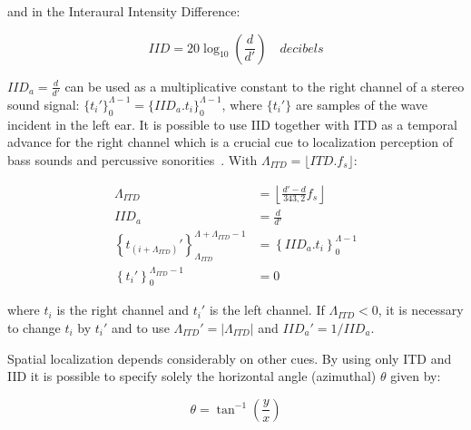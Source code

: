 \noindent and in the Interaural Intensity Difference:

\begin{equation}\label{eq:dii}
IID=20\log_{10}\left (\frac{d}{d'}\right) \quad decibels
\end{equation}

$IID_a=\frac{d}{d'}$ can be used as a multiplicative constant to the right channel of a stereo sound signal: $\{t_i'\}_0^{\Lambda -1}=\{IID_a . t_i\}_0^{\Lambda -1}$, where $\{t_i'\}$ are samples of the wave incident in the left ear. It is possible to use IID together with ITD as a temporal advance for the right channel which is a crucial cue to localization perception of bass sounds and percussive sonorities~\cite{Heeger}. 
With $\Lambda_{ITD}=\lfloor ITD . f_s \rfloor$:

\begin{equation}\label{eq:locImpl}
\begin{split}
\Lambda_{ITD} & = \left \lfloor \frac{d'-d}{343,2}  f_s \right \rfloor \\
IID_a & = \frac{d}{d'} \\
\left\{t_{(i+\Lambda_{ITD})}'\right\}_{\Lambda_{ITD}}^{\Lambda+\Lambda_{ITD}-1} & =\left\{IID_a . t_i\right\}_0^{\Lambda-1} \\
\left\{t_i'\right\}_0^{\Lambda_{ITD}-1} & = 0
\end{split}
\end{equation}

\noindent where $t_i$ is the right channel and $t_i'$ is the left channel.
If $\Lambda_{ITD} < 0$, it is necessary to change $t_i$ by $t_i'$
and to use $\Lambda_{ITD}'= | \Lambda_{ITD} | $ and $IID_a'=1 / IID_a$.

Spatial localization depends considerably on other cues. By using only ITD and IID it is possible to specify solely the horizontal angle (azimuthal) $\theta$ given by:

\begin{equation}\label{eq:angulo}
\theta=\tan^{-1}\left ( \frac{y}{ x }  \right )
\end{equation}

